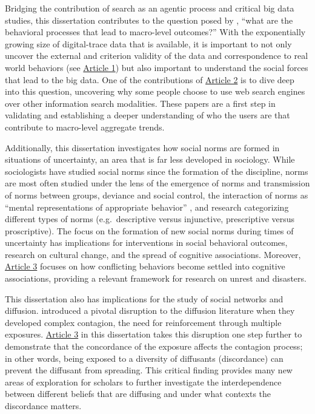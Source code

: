Bridging the contribution of search as an agentic process and critical big data
studies, this dissertation contributes to the question posed by
\citet{breigerScaling2015}, ``what are the behavioral processes that lead to
macro-level outcomes?'' With the exponentially growing size of digital-trace data
that is available, it is important to not only uncover the external and
criterion validity of the data and correspondence to real world behaviors (see
\hyperlink{paper-1}{Article 1}) but also important to understand the social
forces that lead to the big data. One of the contributions of
\hyperlink{paper-2}{Article 2} is to dive deep into this question, uncovering
why some people choose to use web search engines over other information search
modalities. These papers are a first step in validating and establishing a
deeper understanding of who the users are that contribute to macro-level
aggregate trends.

Additionally, this dissertation investigates how social norms are formed in
situations of uncertainty, an area that is far less developed in sociology.
While sociologists have studied social norms since the formation of the
discipline, norms are most often studied under the lens of the emergence of
norms and transmission of norms between groups, deviance and social control, the
interaction of norms as ``mental representations of appropriate behavior''
\citep{aarts2003silence}, and research categorizing different types of norms
(e.g.\, descriptive versus injunctive, prescriptive versus proscriptive). The
focus on the formation of new social norms during times of uncertainty has
implications for interventions in social behavioral outcomes, research on
cultural change, and the spread of cognitive associations. Moreover,
\hyperlink{paper-3}{Article 3} focuses on how conflicting behaviors become
settled into cognitive associations, providing a relevant framework for research
on unrest and disasters.

This dissertation also has implications for the study of social networks and
diffusion. \citet{centolaComplexContagionsWeakness2007} introduced a pivotal
disruption to the diffusion literature when they developed complex contagion,
the need for reinforcement through multiple exposures.
\hyperlink{paper-3}{Article 3} in this dissertation takes this disruption one
step further to demonstrate that the concordance of the exposure affects the
contagion process; in other words, being exposed to a diversity of diffusants
(discordance) can prevent the diffusant from spreading. This critical finding
provides many new areas of exploration for scholars to further investigate the
interdependence between different beliefs that are diffusing and under what
contexts the discordance matters.

